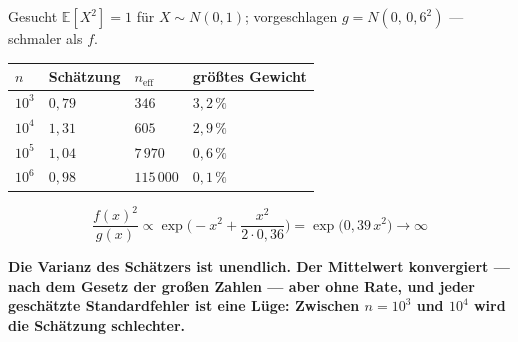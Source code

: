 \begin{warnung}
Gesucht $\mathbb E[X^2] = 1$ für $X\sim N(0,1)$; vorgeschlagen $g = N(0,\,0{,}6^2)$ --- schmaler als $f$.

\begin{center}
{\small
\renewcommand{\arraystretch}{1.48}
\begin{tabular}{@{}P{1.8cm}P{2.2cm}P{2.0cm}P{2.6cm}@{}}
\toprule
$n$ & \textbf{Schätzung} & $n_{\text{eff}}$ & \textbf{größtes Gewicht}\\
\midrule
$10^{3}$ & $0{,}79$ & $346$ & $3{,}2\,\%$\\
$10^{4}$ & $1{,}31$ & $605$ & $2{,}9\,\%$\\
$10^{5}$ & $1{,}04$ & $7\,970$ & $0{,}6\,\%$\\
$10^{6}$ & $0{,}98$ & $115\,000$ & $0{,}1\,\%$\\
\bottomrule
\end{tabular}}
\end{center}

\[ \frac{f(x)^2}{g(x)} \propto \exp\!\Big(-x^2 + \frac{x^2}{2\cdot0{,}36}\Big) = \exp\big(0{,}39\,x^2\big) \to \infty \]

\begin{center}
\begin{minipage}{0.9\textwidth}
\textbf{Die Varianz des Schätzers ist unendlich. Der Mittelwert konvergiert --- nach dem Gesetz der großen Zahlen --- aber ohne Rate, und jeder geschätzte Standardfehler ist eine Lüge: Zwischen $n=10^3$ und $10^4$ wird die Schätzung schlechter.}
\end{minipage}
\end{center}

\begin{center}
\begin{minipage}{0.88\textwidth}
\end{minipage}
\end{center}
\end{warnung}

